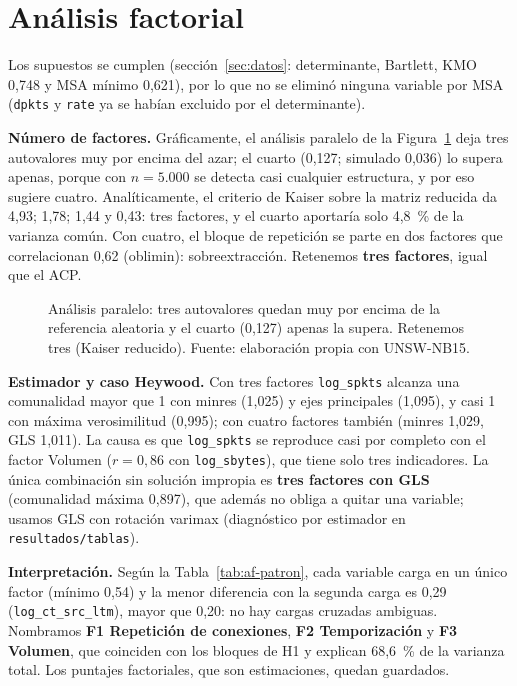 \section{Análisis factorial}
\label{sec:af}

Los supuestos se cumplen (sección~\ref{sec:datos}: determinante, Bartlett, KMO 0,748 y MSA mínimo 0,621), por lo que no se eliminó ninguna variable por MSA (\texttt{dpkts} y \texttt{rate} ya se habían excluido por el determinante).

\textbf{Número de factores.} Gráficamente, el análisis paralelo \citep{horn1965} de la Figura~\ref{fig:af-paralelo} deja tres autovalores muy por encima del azar; el cuarto (0,127; simulado 0,036) lo supera apenas, porque con $n=5.000$ se detecta casi cualquier estructura, y por eso sugiere cuatro. Analíticamente, el criterio de Kaiser sobre la matriz reducida da 4,93; 1,78; 1,44 y 0,43: tres factores, y el cuarto aportaría solo 4,8~\% de la varianza común. Con cuatro, el bloque de repetición se parte en dos factores que correlacionan 0,62 (oblimin): sobreextracción. Retenemos \textbf{tres factores}, igual que el ACP.

\begin{figure}[htbp]
  \centering
  \caption[Análisis paralelo del AF]{Análisis paralelo: tres autovalores quedan muy por encima de la referencia aleatoria y el cuarto (0,127) apenas la supera. Retenemos tres (Kaiser reducido). Fuente: elaboración propia con UNSW-NB15.}
  \label{fig:af-paralelo}
\end{figure}

\textbf{Estimador y caso Heywood.} Con tres factores \texttt{log\_spkts} alcanza una comunalidad mayor que 1 con minres (1,025) y ejes principales (1,095), y casi 1 con máxima verosimilitud (0,995); con cuatro factores también (minres 1,029, GLS 1,011). La causa es que \texttt{log\_spkts} se reproduce casi por completo con el factor Volumen ($r=0{,}86$ con \texttt{log\_sbytes}), que tiene solo tres indicadores. La única combinación sin solución impropia es \textbf{tres factores con GLS} (comunalidad máxima 0,897), que además no obliga a quitar una variable; usamos GLS con rotación varimax (diagnóstico por estimador en \texttt{resultados/tablas}).

\textbf{Interpretación.} Según la Tabla~\ref{tab:af-patron}, cada variable carga en un único factor (mínimo 0,54) y la menor diferencia con la segunda carga es 0,29 (\texttt{log\_ct\_src\_ltm}), mayor que 0,20: no hay cargas cruzadas ambiguas. Nombramos \textbf{F1 Repetición de conexiones}, \textbf{F2 Temporización} y \textbf{F3 Volumen}, que coinciden con los bloques de H1 y explican 68,6~\% de la varianza total. Los puntajes factoriales, que son estimaciones, quedan guardados.

